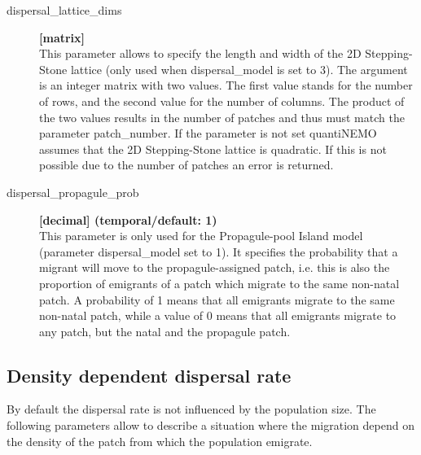 \documentclass[letterpaper,12pt,oneside]{book}
\begin{document}
\begin{description}
\item[dispersal\_lattice\_dims] \textbf{[matrix]}\\
This parameter allows to specify the length and width of the 2D Stepping-Stone lattice (only used when \textsf{dispersal\_model} is set to 3). The argument is an integer matrix with two values. The first value stands for the number of rows, and the second value for the number of columns. The product of the two values results in the number of patches and thus must match the parameter \textsf{patch\_number}. If the parameter is not set quantiNEMO assumes that the 2D Stepping-Stone lattice is quadratic. If this is not possible due to the number of patches an error is returned. 


\item[dispersal\_propagule\_prob] \textbf{[decimal] (temporal/default: 1)}\\
This parameter is only used for the Propagule-pool Island model (parameter \textsf{dispersal\_model} set to 1). It specifies the probability that a migrant will move to the propagule-assigned patch, i.e. this is also the proportion of emigrants of a patch which migrate to the same non-natal patch. A probability of 1 means that all emigrants migrate to the same non-natal patch, while a value of 0 means that all emigrants migrate to any patch, but the natal and the propagule patch. 

\end{description}

\subsection{Density dependent dispersal rate}
By default the dispersal rate is not influenced by the population size. The following parameters allow to describe a situation where the migration depend on the density of the patch from which the population emigrate. 
\end{document}
